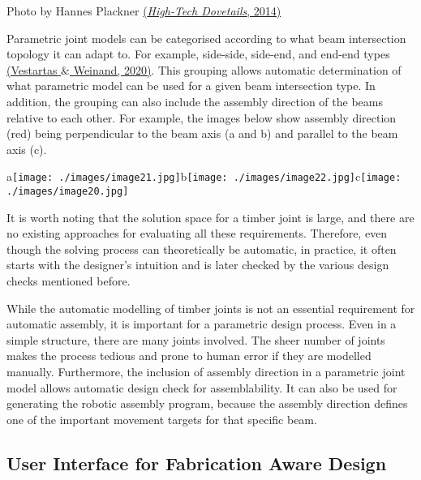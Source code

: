 {\footnotesize Photo by Hannes Plackner \href{https://www.zotero.org/google-docs/?ijZDtG}{(}\href{https://www.zotero.org/google-docs/?ijZDtG}{\textit{High-Tech Dovetails}\href{https://www.zotero.org/google-docs/?ijZDtG}{}, 2014)}}

\begin{flushleft}
Parametric joint models can be categorised according to what beam intersection topology it can adapt to. For example, side-side, side-end, and end-end types \href{https://www.zotero.org/google-docs/?SzXV4K}{(Vestartas $\&$ Weinand, 2020)}{\footnotesize .} This grouping allows automatic determination of what parametric model can be used for a given beam intersection type. In addition, the grouping can also include the assembly direction of the beams relative to each other. For example, the images below show assembly direction (red) being perpendicular to the beam axis (a and b) and parallel to the beam axis (c).
\end{flushleft}


\begin{flushleft}
{\footnotesize a\texttt{[image: ./images/image21.jpg]}b\texttt{[image: ./images/image22.jpg]}c\texttt{[image: ./images/image20.jpg]}}
\end{flushleft}


It is worth noting that the solution space for a timber joint is large, and there are no existing approaches for evaluating all these requirements. Therefore, even though the solving process can theoretically be automatic, in practice, it often starts with the designer’s intuition and is later checked by the various design checks mentioned before. 

While the automatic modelling of timber joints is not an essential requirement for automatic assembly, it is important for a parametric design process. Even in a simple structure, there are many joints involved. The sheer number of joints makes the process tedious and prone to human error if they are modelled manually. Furthermore, the inclusion of assembly direction in a parametric joint model allows automatic design check for assemblability. It can also be used for generating the robotic assembly program, because the assembly direction defines one of the important movement targets for that specific beam. 

\subsection{User Interface for Fabrication Aware Design}


